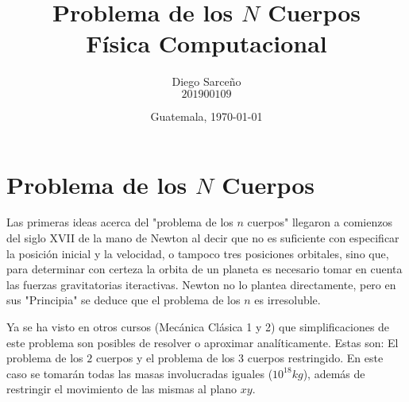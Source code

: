 





\title{\sc Problema de los $N$ Cuerpos \\ \footnotesize{Física Computacional}}%
\author{Diego Sarceño \\ $201900109$}
\date{Guatemala, \today}

  
\maketitle





\section{Problema de los $N$ Cuerpos}
\label{sec:Problema de los $N$ Cuerpos}
\justify
Las primeras ideas acerca del "problema de los $n$ cuerpos" llegaron a comienzos del siglo XVII de la mano de Newton al decir que no es suficiente con especificar la posición inicial y la velocidad, o tampoco tres posiciones orbitales, sino que, para determinar con certeza la orbita de un planeta es necesario tomar en cuenta las fuerzas gravitatorias iteractivas. Newton no lo plantea directamente, pero en sus "Principia" se deduce que el problema de los $n$ es irresoluble.

Ya se ha visto en otros cursos (Mecánica Clásica 1 y 2) que simplificaciones de este problema son posibles de resolver o aproximar analíticamente. Estas son: El problema de los $2$ cuerpos y el problema de los $3$ cuerpos restringido. En este caso se tomarán todas las masas involucradas iguales ($10^{18} kg$), además de restringir el movimiento de las mismas al plano $xy$.









